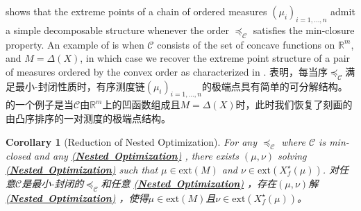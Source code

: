 \documentclass[12pt,letterpaper]{article}
\newenvironment{original}{\color{black}}{}
\newenvironment{translation}{\color{blue}}{}
\theoremstyle{plain}
\newtheorem{cor}{Corollary}
\theoremstyle{definition}
\theoremstyle{remark}
\newcommand{\C}{\mathcal{C}}
\newcommand{\R}{\mathds{R}}
\newcommand{\Ext}{\mathrm{ext}}
\theoremstyle{definition}
\DeclareRobustCommand{\weqref}[2]{
  \leavevmode\nobreak\hbox{\hyperlink{#2}{\textup{(#1)}}}
}
\begin{document}
\begin{original}
 shows that the extreme points of a chain of ordered measures $(\mu_i)_{i=1,\dots,n}$ admit a simple decomposable structure whenever the order $\preceq_\C$ satisfies the min-closure property. An example of  is when $\C$ consists of the set of concave functions on $\R^m$, and $M = \Delta(X)$, in which case we recover the extreme point structure of a pair of measures ordered by the convex order as characterized in  \citet{Ciosmak2023}.
\end{original}
\begin{translation}
表明，每当序$\preceq_\C$满足最小-封闭性质时，有序测度链$(\mu_i)_{i=1,\dots,n}$的极端点具有简单的可分解结构。的一个例子是当$\C$由$\R^m$上的凹函数组成且$M = \Delta(X)$时，此时我们恢复了\citet{Ciosmak2023}刻画的由凸序排序的一对测度的极端点结构。
\end{translation}

\begin{cor}[Reduction of Nested Optimization]\label{cor:nested-optimization}
\begin{original}
For any $\preceq_\C$ where $\C$ is min-closed and any  \weqref{\textbf{Nested Optimization}}{eq:nested-optimization}, there exists $(\mu,\nu)$ solving \weqref{\textbf{Nested Optimization}}{eq:nested-optimization} such that $\mu \in \Ext(M)$ and $\nu \in \Ext(X^\star_f(\mu))$.
\end{original}
\begin{translation}
对任意$\C$是最小-封闭的$\preceq_\C$和任意\weqref{\textbf{Nested Optimization}}{eq:nested-optimization}，存在$(\mu,\nu)$解\weqref{\textbf{Nested Optimization}}{eq:nested-optimization}，使得$\mu \in \Ext(M)$且$\nu \in \Ext(X^\star_f(\mu))$。
\end{translation}
\end{cor}
\end{document}
